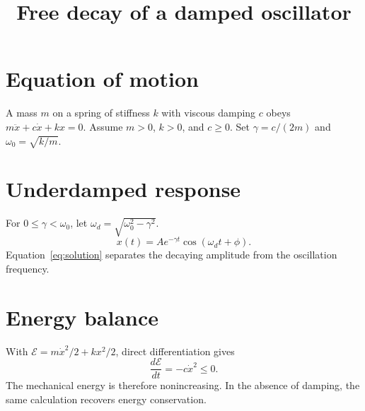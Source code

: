 \documentclass[11pt]{article}
\title{Free decay of a damped oscillator}
\author{}\date{}
\begin{document}
\maketitle
\section{Equation of motion}
A mass $m$ on a spring of stiffness $k$ with viscous damping $c$
obeys $m\ddot x+c\dot x+kx=0$.
Assume $m>0$, $k>0$, and $c\geq0$.
Set $\gamma=c/(2m)$ and $\omega_0=\sqrt{k/m}$.
\section{Underdamped response}
For $0\leq\gamma<\omega_0$, let
$\omega_d=\sqrt{\omega_0^2-\gamma^2}$.
\begin{equation}\label{eq:solution}
 x(t)=A e^{-\gamma t}\cos(\omega_d t+\phi).
\end{equation}
Equation~\eqref{eq:solution} separates the decaying amplitude
from the oscillation frequency.
\section{Energy balance}
With $\mathcal E=m\dot x^2/2+kx^2/2$, direct differentiation gives
\[\frac{d\mathcal E}{dt}=-c\dot x^2\leq0.\]
The mechanical energy is therefore nonincreasing.
In the absence of damping, the same calculation recovers energy conservation.
\end{document}
